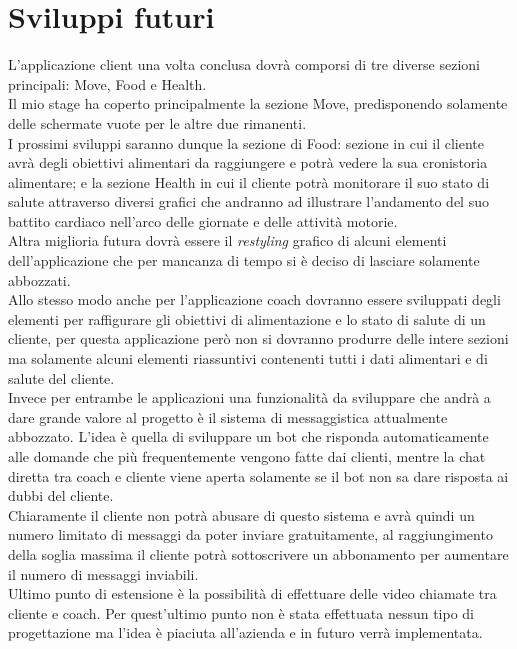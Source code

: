 \section{Sviluppi futuri}
L'applicazione client una volta conclusa dovrà comporsi di tre diverse sezioni principali: Move, Food e Health.\\
Il mio stage ha coperto principalmente la sezione Move, predisponendo solamente delle schermate vuote per le altre due rimanenti.\\
I prossimi sviluppi saranno dunque la sezione di Food: sezione in cui il cliente avrà degli obiettivi alimentari da raggiungere e potrà vedere la sua cronistoria alimentare; e la sezione Health in cui il cliente potrà monitorare il suo stato di salute attraverso diversi grafici che andranno ad illustrare l'andamento del suo battito cardiaco nell'arco delle giornate e delle attività motorie.\\
Altra miglioria futura dovrà essere il \textit{restyling} grafico di alcuni elementi dell'applicazione che per mancanza di tempo si è deciso di lasciare solamente abbozzati.\\
Allo stesso modo anche per l'applicazione coach dovranno essere sviluppati degli elementi per raffigurare gli obiettivi di alimentazione e lo stato di salute di un cliente, per questa applicazione però non si dovranno produrre delle intere sezioni ma solamente alcuni elementi riassuntivi contenenti tutti i dati alimentari e di salute del cliente.\\
Invece per entrambe le applicazioni una funzionalità da sviluppare che andrà a dare grande valore al progetto è il sistema di messaggistica attualmente abbozzato. L'idea è quella di sviluppare un \gls{bot} che risponda automaticamente alle domande che più frequentemente vengono fatte dai clienti, mentre la chat diretta tra coach e cliente viene aperta solamente se il \gls{bot} non sa dare risposta ai dubbi del cliente.\\
Chiaramente il cliente non potrà abusare di questo sistema e avrà quindi un numero limitato di messaggi da poter inviare gratuitamente, al raggiungimento della soglia massima il cliente potrà sottoscrivere un abbonamento per aumentare il numero di messaggi inviabili.\\
Ultimo punto di estensione è la possibilità di effettuare delle video chiamate tra cliente e coach. Per quest'ultimo punto non è stata effettuata nessun tipo di progettazione ma l'idea è piaciuta all'azienda e in futuro verrà implementata.
